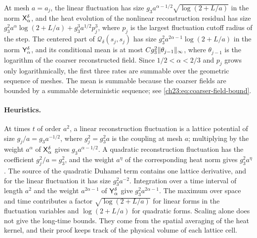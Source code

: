 At mesh $a=a_j$, the linear fluctuation has size $g_3a^{\alpha-1/2}\sqrt{\log(2+L/a)}$ in the norm $\mathsf X_{\alpha}^{\delta}$, and the heat evolution of the nonlinear reconstruction residual has size $g_3^2a^\alpha\log(2+L/a)+g_3^3a^{1/2}p_j^3$, where $p_j$ is the largest fluctuation cutoff radius of the step. The centered part of $\mathcal Q_\delta(s_j,s_j)$ has size $g_3^2a^{2\alpha-1}\log(2+L/a)$ in the norm $\mathsf Y_{\alpha}^{\delta}$, and its conditional mean is at most $Cg_3^2\lVert \theta_{j-1}\rVert_\infty$, where $\theta_{j-1}$ is the logarithm of the coarser reconstructed field. Since $1/2<\alpha<2/3$ and $p_j$ grows only logarithmically, the first three rates are summable over the geometric sequence of meshes. The mean is summable because the coarser fields are bounded by a summable deterministic sequence; see \eqref{ch23:eq:coarser-field-bound}.

\paragraph{Heuristics.}
At times $t$ of order $a^2$, a linear reconstruction fluctuation is a lattice potential of size $g_j/a=g_3a^{-1/2}$, where $g_j^2=g_3^2a$ is the coupling at mesh $a$; multiplying by the weight $a^\alpha$ of $\mathsf X_{\alpha}^{\delta}$ gives $g_3a^{\alpha-1/2}$. A quadratic reconstruction fluctuation has the coefficient $g_j^2/a=g_3^2$, and the weight $a^\eta$ of the corresponding heat norm gives $g_3^2a^\eta$. The source of the quadratic Duhamel term contains one lattice derivative, and for the linear fluctuation it has size $g_3^2a^{-2}$. Integration over a time interval of length $a^2$ and the weight $a^{2\alpha-1}$ of $\mathsf Y_{\alpha}^{\delta}$ give $g_3^2a^{2\alpha-1}$. The maximum over space and time contributes a factor $\sqrt{\log(2+L/a)}$ for linear forms in the fluctuation variables and $\log(2+L/a)$ for quadratic forms. Scaling alone does not give the long-time bounds. They come from the spatial averaging of the heat kernel, and their proof keeps track of the physical volume of each lattice cell.

